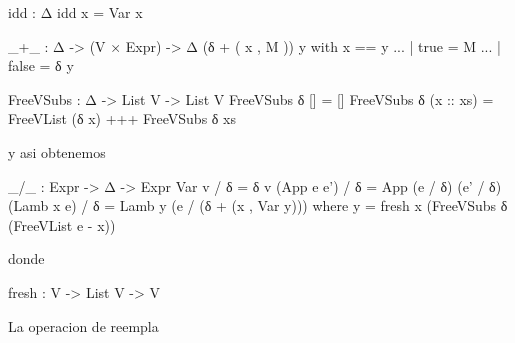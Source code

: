  idd : Δ
 idd x = Var x

 _+_ : Δ -> (V × Expr) -> Δ
 (δ + ( x , M )) y with x == y
 ... | true = M
 ... | false = δ y
    
 FreeVSubs : Δ -> List V -> List V
 FreeVSubs δ [] = []
 FreeVSubs δ (x :: xs) = FreeVList (δ x) +++ FreeVSubs δ xs 

y asi obtenemos

 _/_ : Expr -> Δ -> Expr
 Var v / δ = δ v
 (App e e') / δ = App (e / δ) (e' / δ)
 (Lamb x e) / δ = Lamb y (e / (δ + (x , Var y)))
   where y = fresh x (FreeVSubs δ (FreeVList e - x))

donde 

 fresh : V -> List V -> V


 La operacion de reempla


